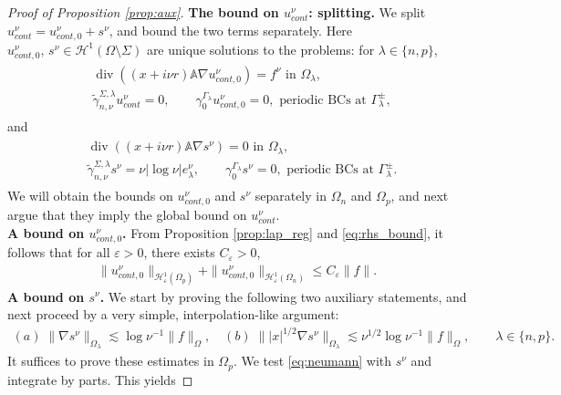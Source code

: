 \documentclass[report]{elsarticle}
\numberwithin{theorem}{section}
\newcommand{\re}{\varepsilon}
\begin{document}
\begin{proof}[Proof of Proposition \ref{prop:aux}]
	\textbf{The bound on $u^{\nu}_{cont}$: splitting. }
	We split $u^{\nu}_{cont}=u^{\nu}_{cont,0}+s^{\nu}$, and bound the two terms separately. Here $u^{\nu}_{cont,0},\,  s^{\nu}\in \mathcal{H}^1(\Omega\setminus\Sigma)$ are unique solutions to the problems: for $\lambda\in \{n,p\}$, 
	\begin{align}
		\label{eq:unucont0pb}
		\begin{split}
			&\operatorname{div}((x+i\nu r)\mathbb{A}\nabla u^{\nu}_{cont,0})=f^{\nu} \text{ in }\Omega_{\lambda},\\
			&\widetilde{\gamma}_{n,\nu}^{\Sigma,\lambda}u^{\nu}_{cont}=0, \qquad{\gamma_0^{\Gamma_{\lambda}}u^{\nu}_{cont,0}=0, } \text{ periodic BCs at }\Gamma^{\pm}_{\lambda},
		\end{split}
	\end{align}
	and 
	\begin{align}
		\label{eq:neumann}
		\begin{split}
			&\operatorname{div}((x+i\nu r)\mathbb{A}\nabla s^{\nu})=0 \text{ in }\Omega_{\lambda},\\
			&\widetilde{\gamma}_{n,\nu}^{\Sigma,\lambda}s^{\nu}=\nu|\log\nu|e^{\nu}_{\lambda}, \qquad{\gamma_0^{\Gamma_{\lambda}}s^{\nu}=0, } \text{ periodic BCs at }\Gamma^{\pm}_{\lambda}.
		\end{split}
	\end{align}
	We will obtain the bounds on $u^{\nu}_{cont,0}$ and $s^{\nu}$ separately in $\Omega_n$ and $\Omega_p$, and next argue that they imply the global bound on $u^{\nu}_{cont}$. \\
	\textbf{A bound on $u^{\nu}_{cont,0}$. }From Proposition \ref{prop:lap_reg} and \eqref{eq:rhs_bound}, it follows that for all $\re>0$, there exists $C_{\re}>0$, 
	\begin{align}
		\label{eq:boununu0}
		\|u^{\nu}_{cont,0}\|_{\mathcal{H}^1_{\re}(\Omega_p)}+	\|u^{\nu}_{cont,0}\|_{\mathcal{H}^1_{\re}(\Omega_n)}\leq C_{\re}\|f\|.
	\end{align}
	\textbf{A bound on $s^{\nu}$. }We start by proving the following two auxiliary statements, and next proceed by a very simple, interpolation-like argument:
	\begin{align}
		\label{eq:snu1}
		(a)\; 
		\|\nabla s^{\nu}\|_{\Omega_{\lambda}}\lesssim \log\nu^{-1}\|f\|_{\Omega}, \quad 
		(b)\;\||x|^{1/2}\nabla s^{\nu}\|_{\Omega_{\lambda}}\lesssim \nu^{1/2}\log\nu^{-1}\|f\|_{\Omega},\qquad  \lambda\in \{n,p\}.  
	\end{align}
	It suffices to prove these estimates in $\Omega_p$. We test \eqref{eq:neumann} with $s^{\nu}$ and integrate by parts. This yields 

\end{proof}
\end{document}
